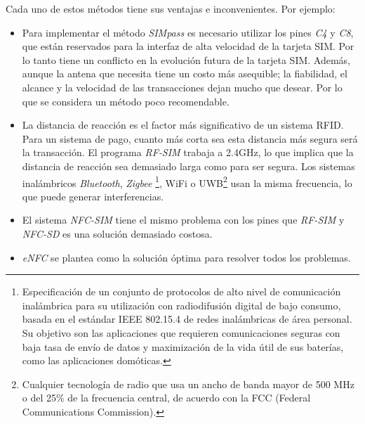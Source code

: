
  Cada uno de estos métodos tiene sus ventajas e inconvenientes. Por ejemplo:
  \begin{itemize}
  \item Para implementar el método \emph{SIMpass} es necesario utilizar los
  pines \emph{C4} y \emph{C8}, que están reservados para la interfaz de alta
  velocidad de la tarjeta \acs{SIM}. Por lo tanto tiene un conflicto en la
  evolución futura de la tarjeta \acs{SIM}. Además, aunque la antena que
  necesita tiene un costo más asequible; la fiabilidad, el alcance y la
  velocidad de las transacciones dejan mucho que desear. Por lo que se 
  considera un método poco recomendable.
  \item La distancia de reacción es el factor más significativo de un sistema
  \acs{RFID}. Para un sistema de pago, cuanto más corta sea esta distancia
  más segura será la transacción. El programa \emph{RF-SIM} trabaja a 2.4GHz,
  lo que implica que la distancia de reacción sea demasiado larga como para ser
  segura. Los sistemas inalámbricos \emph{Bluetooth}, \emph{Zigbee}
  \footnote{Especificación de un conjunto de protocolos de alto nivel de 
  comunicación inalámbrica para su utilización con radiodifusión digital de 
  bajo consumo, basada en el estándar IEEE 802.15.4 de redes inalámbricas de 
  área personal. Su objetivo son las aplicaciones que requieren comunicaciones 
  seguras con baja tasa de envío de datos y maximización de la vida útil de 
  sus baterías, como las aplicaciones domóticas.},
  \acs{WiFi} o \acs{UWB}\footnote{Cualquier tecnología de radio que usa un
  ancho de banda mayor de 500 MHz o del 25\% de la frecuencia central, de 
  acuerdo con la FCC (Federal Communications Commission).} usan la misma 
  frecuencia, lo que puede generar interferencias.
  \item El sistema \emph{NFC-SIM} tiene el mismo problema con los pines que
  \emph{RF-SIM} y \emph{NFC-SD} es una solución demasiado costosa.
  \item \emph{eNFC} se plantea como la solución óptima para resolver todos los
  problemas.
  \end{itemize}

